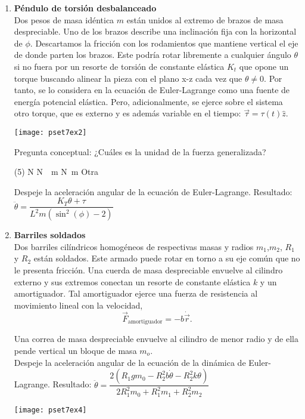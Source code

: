 \documentclass[11pt, spanish, a4paper, twoside]{article}
\begin{document}
\begin{enumerate}
\item 
\begin{minipage}[t][6cm]{0.6\textwidth}
\textbf{Péndulo de torsión desbalanceado}\\
Dos pesos de masa idéntica $m$ están unidos al extremo de brazos de masa despreciable.
Uno de los brazos describe una inclinación fija con la horizontal de $\phi$.
Descartamos la fricción con los rodamientos que mantiene vertical el eje de donde parten los brazos.
Este podría rotar libremente a cualquier ángulo $\theta$ si no fuera por un resorte de torsión de constante elástica $K_t$ que opone un torque buscando alinear la pieza con el plano x-z cada vez que $\theta \neq 0$.
Por tanto, se lo considera en la ecuación de Euler-Lagrange como una fuente de energía potencial elástica.
Pero, adicionalmente, se ejerce sobre el sistema otro torque, que es externo y es además variable en el tiempo: $\vec{\tau}= \tau (t) \hat{z}$.
\end{minipage}
\begin{minipage}[c][1cm][t]{0.35\textwidth}
	\texttt{[image: pset7ex2]}
\end{minipage}
Pregunta conceptual:
¿Cuáles es la unidad de la fuerza generalizada?\\
\begin{tasks}(5)
	\task \si{\newton}
	\task \si{\newton \over \metre}
	\task \si{\newton \metre}
	\task Otra
\end{tasks}
Despeje la aceleración angular de la ecuación de Euler-Lagrange. Resultado:
\(
	\ddot{\theta} = \dfrac{K_{T} \theta + \tau}{L^{2} m \left(\sin^{2}{\left(\phi \right)} - 2\right)}
\) 


\newpage

\item
\begin{minipage}[t][7.5cm]{0.6\textwidth}
\textbf{Barriles soldados}\\
Dos barriles cilíndricos homogéneos de respectivas masas y radios $m_1$,$m_2$, $R_1$ y $R_2$ están soldados.
Este armado puede rotar en torno a su eje común que no le presenta fricción.
Una cuerda de masa despreciable envuelve al cilindro externo y sus extremos conectan un resorte de constante elástica $k$ y un amortiguador.
Tal amortiguador ejerce una fuerza de resistencia al movimiento lineal con la velocidad,
$$
\vec{F}_\mathrm{amortiguador} = - b \dot{\vec{r}}.
$$

Una correa de masa despreciable envuelve al cilindro de menor radio y de ella pende vertical un bloque de masa $m_o$.\\
Despeje la aceleración angular de la ecuación de la dinámica de Euler-Lagrange. 
Resultado:
\(
	\ddot{\theta} = \dfrac{2 \left(R_{1} g m_{0} - R_{2}^{2} b \dot{\theta} - R_{2}^{2} k \theta\right)}{2 R_{1}^{2} m_{0} + R_{1}^{2} m_{1} + R_{2}^{2} m_{2}}
\)
\end{minipage}
\begin{minipage}[c][-1cm][t]{0.35\textwidth}
	\texttt{[image: pset7ex4]}
\end{minipage}




\end{enumerate}
\end{document}

